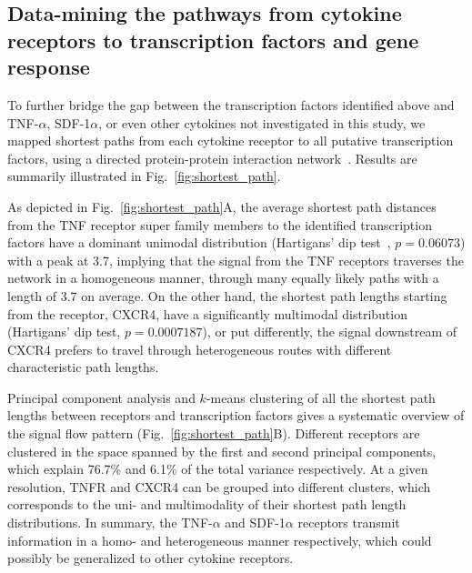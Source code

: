
\subsection*{Data-mining the pathways from cytokine receptors to transcription factors and gene response}


To further bridge the gap between the transcription factors identified above and TNF-$\alpha$, SDF-1$\alpha$, or even other cytokines not investigated in this
study, we mapped shortest paths from each cytokine receptor to all putative transcription factors, using a directed protein-protein
interaction network~\cite{Vinayagam2011}.  Results are summarily  illustrated in Fig.~\ref{fig:shortest_path}.


As depicted in Fig.~\ref{fig:shortest_path}A, 
the average shortest path distances from the TNF receptor super family 
members to the identified transcription factors have a dominant 
unimodal distribution 
(Hartigans' dip test~\cite{Hartigan1985}, $p=0.06073$) with a peak at 3.7, 
implying that the signal from the TNF receptors traverses 
the network in a homogeneous manner, through many equally likely paths
with a length of 3.7 on average. On the other hand, the shortest path lengths 
starting from the \sdfonea receptor,  CXCR4, have a significantly 
multimodal distribution (Hartigans' dip test,  $p=0.0007187$), 
or put differently, the signal downstream of CXCR4 prefers to travel 
through heterogeneous routes with different characteristic path lengths.

Principal component analysis and $k$-means 
clustering of all the shortest path lengths between receptors
and transcription factors gives a systematic overview of the signal flow
pattern (Fig.~\ref{fig:shortest_path}B).
Different receptors are clustered in the space spanned by the first
and second principal components, which explain 76.7\% and 6.1\% of the total 
variance respectively. At a given resolution, TNFR and CXCR4 can be grouped into
different clusters, which corresponds to the uni- and multimodality of their shortest
path length distributions. In summary, the TNF-$\alpha$ and SDF-1$\alpha$ 
receptors transmit
information in a homo- and heterogeneous manner respectively, which could
possibly be generalized to other cytokine receptors.


